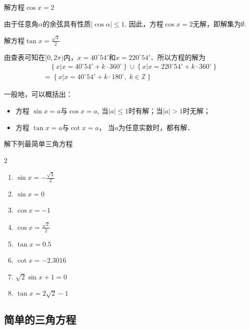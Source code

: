 \begin{example}
    解方程$\cos x=2$
\end{example}

\begin{solution}
    由于任意角$\alpha$的余弦具有性质$|\cos\alpha|\le 1$, 因此，方程$\cos x=2$无解，即解集为$\emptyset$.
\end{solution}

\begin{example}
    解方程$\tan x=\frac{\sqrt{3}}{2}$
\end{example}

\begin{solution}
    由查表可知在$[0, 2\pi)$内，$x=40^{\circ}54'$和$x=220^{\circ}54'$．所以方程的解为
\[\begin{split}
   & \quad \left\{x\Big|x=40^{\circ}54'+k\cdot 360^{\circ}\right\} \cup \left\{x\Big|x=220^{\circ}54'+k\cdot 360^{\circ}\right\}\\
   &=\left\{x\Big|x=40^{\circ}54'+k\cdot 180^{\circ},\; k\in\mathbb{Z}\right\}
\end{split}\]
\end{solution}

一般地，可以概括出：
\begin{itemize}
    \item 方程 $\sin x=a$与$\cos x=a$, 当$|a|\le 1$时有解；当$|a|>1$时无解；
    \item 方程 $\tan x=a$与$\cot x=a$， 当$a$为任意实数时，都有解．
\end{itemize}

\begin{ex}
    解下列最简单三角方程
\begin{multicols}{2}
\begin{enumerate}
    \item $\sin x=-\frac{\sqrt{3}}{2}$
    \item $\sin x=0$
    \item $\cos x=-1$
    \item $\cos x=\frac{\sqrt{2}}{2}$
    \item $\tan x=0.5$
    \item $\cot x=-2.3016$
    \item $\sqrt{2}\sin x+1=0$
    \item $\tan x=2\sqrt{2}-1$
\end{enumerate}
\end{multicols}
\end{ex}

\subsection{简单的三角方程}


